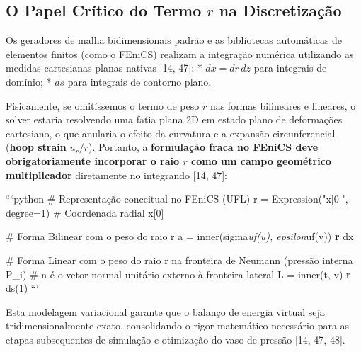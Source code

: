 \subsection{O Papel Crítico do Termo $r$ na Discretização}

Os geradores de malha bidimensionais padrão e as bibliotecas automáticas de elementos finitos (como o FEniCS) realizam a integração numérica utilizando as medidas cartesianas planas nativas [14, 47]:
* $d x = d r \, d z$ para integrais de domínio;
* $d s$ para integrais de contorno plano.

Fisicamente, se omitíssemos o termo de peso $r$ nas formas bilineares e lineares, o solver estaria resolvendo uma fatia plana 2D em estado plano de deformações cartesiano, o que anularia o efeito da curvatura e a expansão circunferencial (\textbf{hoop strain} $u_r/r$). Portanto, a \textbf{formulação fraca no FEniCS deve obrigatoriamente incorporar o raio $r$ como um campo geométrico multiplicador} diretamente no integrando [14, 47]:

```python
# Representação conceitual no FEniCS (UFL)
r = Expression("x[0]", degree=1) # Coordenada radial x[0]

# Forma Bilinear com o peso do raio r
a = inner(sigma\textit{uf(u), epsilon}uf(v)) \textbf{ r } dx

# Forma Linear com o peso do raio r na fronteira de Neumann (pressão interna P_i)
# n é o vetor normal unitário externo à fronteira lateral
L = inner(t, v) \textbf{ r } ds(1)
```

Esta modelagem variacional garante que o balanço de energia virtual seja tridimensionalmente exato, consolidando o rigor matemático necessário para as etapas subsequentes de simulação e otimização do vaso de pressão [14, 47, 48].



